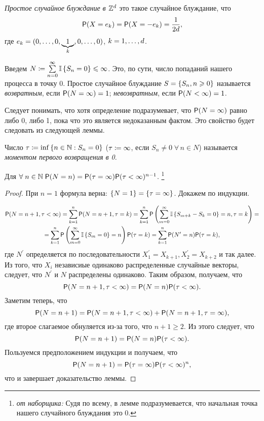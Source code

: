 \begin{df}
	\textit{Простое случайное блуждание в $\mathbb{Z}^d$} \td это такое случайное блуждание, что
	\[
		\mathsf{P}(X = e_k) = \mathsf{P}(X = -e_k) = \frac1{2d},
	\]
	где $e_k = (0 ,\ldots, 0, \underbrace{1}_k, 0 ,\ldots, 0)$, $k = 1 ,\ldots, d$.
\end{df}

\begin{df}
	Введем $N \coloneqq \sum\limits_{n=0}^{\infty} \mathbb{I} \left\{S_n = 0\right\} \leqslant \infty$.
	Это, по сути, число попаданий нашего процесса в точку $0$.
	Простое случайное блуждание $S = \left\{S_n, n \geqslant 0\right\}$ называется \textit{возвратным},
	если $\mathsf{P}(N = \infty) = 1$; \textit{невозвратным}, если $\mathsf{P}(N < \infty) = 1$.
\end{df}

\begin{note}
	Следует понимать, что хотя определение подразумевает, что $\mathsf{P}(N = \infty)$ равно либо 0, либо 1,
	пока что это является недоказанным фактом.
	Это свойство будет следовать из следующей леммы.
\end{note}
\begin{df}
	Число $\tau \coloneqq \inf\left\{ n \in \mathbb{N} : S_{n} = 0\right\}$ ($\tau \coloneqq \infty$,
	если $S_{n} \ne 0 \; \forall\, n \in N$) называется \textit{моментом первого возвращения в 0}.
\end{df}

\begin{lemma}
	Для $ \forall\; n \in \mathbb{N} \; \mathsf{P}(N = n) = \mathsf{P}(\tau = \infty)\mathsf{P}(\tau < \infty)^{n-1}$.
		\footnote{\textit{от наборщика:} Судя по всему, в лемме подразумевается,
			что начальная точка нашего случайного блуждания \td это 0.}
\end{lemma}

\begin{proof}
	При $n = 1$ формула верна: $\left\{ N = 1\right\} = \left\{ \tau = \infty\right\}$.
Докажем по индукции.

	\begin{gather*}
		\mathsf{P}(N = n+1, \tau < \infty) =
		\sum\limits_{k=1}^{n} \mathsf{P}(N = n+1, \tau = k) 
	=	\sum\limits_{k=1}^{n} \mathsf{P}\left( \sum_{m=0}^{\infty} \mathbb{I} \left\{ S_{m+k} - S_k = 0 \right\} = n, \tau = k\right) = \\
	=	\sum\limits_{k=1}^{n} \mathsf{P} \left( \sum_{m=0}^{\infty} \mathbb{I} \left\{ S_m = 0\right\} = n\right) \mathsf{P}(\tau = k) 
	=	\sum\limits_{k=1}^{n} \mathsf{P}(N^{\prime} = n)\mathsf{P}(\tau = k),
	\end{gather*}
	где $N^{\prime}$ определяется по последовательности
	$X_1^{\prime} = X_{k+1}, X_{2}^{\prime} = X_{k+2}$ и так далее.
	Из того, что $X_i$ \td независиые одинаково распределенные случайные векторы,
	следует, что $N^{\prime}$ и $N$ распределены одинаково.
	Таким образом, получаем, что
	\[
		\mathsf{P}(N = n+1, \tau < \infty) = \mathsf{P}(N = n)\mathsf{P}(\tau < \infty).
	\]
	Заметим теперь, что
	\[
		\mathsf{P}(N = n+1) = \mathsf{P}(N = n+1, \tau < \infty) + \mathsf{P}(N = n+1, \tau = \infty),
	\]
	где второе слагаемое обнуляется из-за того, что $n+1 \ge 2$.
	Из этого следует, что
	\[
		\mathsf{P}(N = n+1) = \mathsf{P}(N = n)\mathsf{P}(\tau < \infty).
	\]
		Пользуемся предположением индукции и получаем, что
	\[
		\mathsf{P}(N = n+1) = \mathsf{P}(\tau = \infty)\mathsf{P}(\tau < \infty)^n,
	\]
	что и завершает доказательство леммы.
\end{proof}

